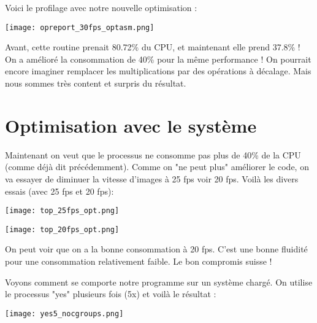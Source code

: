 Voici le profilage avec notre nouvelle optimisation :

\begin{center} 
\hspace{12.45cm}
\texttt{[image: opreport\_30fps\_optasm.png]}
\end{center}
\vspace{0.5cm}

Avant, cette routine prenait 80.72\% du CPU, et maintenant elle prend 37.8\% ! On a amélioré la consommation de 40\% pour la même performance ! On pourrait encore imaginer remplacer les multiplications par des opérations à décalage. Mais nous sommes très content et surpris du résultat.  

\pagebreak \section{Optimisation avec le système}

Maintenant on veut que le processus ne consomme pas plus de 40\% de la CPU (comme déjà dit précédemment). Comme on "ne peut plus" améliorer le code, on va essayer de diminuer la vitesse d'images à 25 fps voir 20 fps. Voilà les divers essais (avec 25 fps et 20 fps):
  
\begin{center} 
\hspace{12.45cm}
\texttt{[image: top\_25fps\_opt.png]}
\end{center}
\vspace{0.5cm}

  
\begin{center} 
\hspace{12.45cm}
\texttt{[image: top\_20fps\_opt.png]}
\end{center}
\vspace{0.5cm}

On peut voir que on a la bonne consommation à 20 fps. C'est une bonne fluidité pour une consommation relativement faible. Le bon compromis suisse !

\pagebreak Voyons comment se comporte notre programme sur un système chargé. On utilise le processus "yes" plusieurs fois (5x) et voilà le résultat :
 
\begin{center} 
\hspace{12.45cm}
\texttt{[image: yes5\_nocgroups.png]}
\end{center}
\vspace{0.5cm}

